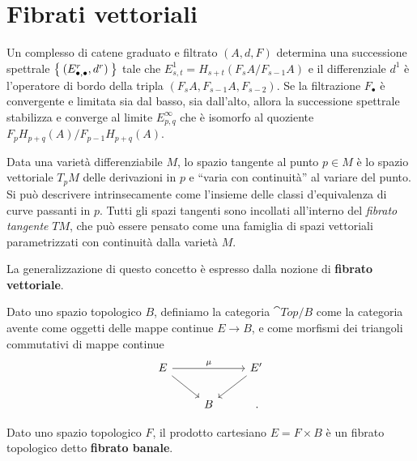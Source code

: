 
\chapter{Fibrati vettoriali}


\begin{thm}
	Un complesso di catene graduato e filtrato $(A,d,F)$ determina una successione spettrale
	$\Set{(E_{\bullet,\bullet}^{r},d^{r})}$ tale che
	$E_{s,t}^{1} = H_{s+t}(F_{s}A/F_{s-1}A)$ e il differenziale $d^{1}$ è
	l'operatore di bordo della tripla $(F_{s}A,F_{s-1}A,F_{s-2})$.
	Se la filtrazione $F_{\bullet}$ è convergente e limitata sia dal basso, sia dall'alto,
	allora la successione spettrale stabilizza e converge al limite $E^{\infty}_{p,q}$
	che è isomorfo al quoziente $F_{p}H_{p+q}(A)/F_{p-1}H_{p+q}(A)$.
\end{thm}



Data una varietà differenziabile $M$, lo spazio tangente al punto $p \in M$
è lo spazio vettoriale $T_{p}M$ delle derivazioni in $p$ e ``varia con continuità''
al variare del punto. Si può descrivere intrinsecamente
come l'insieme delle classi d'equivalenza di curve passanti in $p$.
Tutti gli spazi tangenti sono incollati all'interno
del \emph{fibrato tangente} $TM$, che può essere pensato come
una famiglia di spazi vettoriali 
parametrizzati con continuità dalla varietà $M$.

La generalizzazione di questo concetto è espresso dalla nozione
di \textbf{fibrato vettoriale}.

\begin{df}
	Dato uno spazio topologico $B$, definiamo la categoria $\cat{Top}/B$
	come la categoria avente come oggetti delle mappe continue $E \to B$,
	e come morfismi dei triangoli commutativi di mappe continue
	\begin{equation*}
		\begin{tikzcd}
			E \ar[rr, "\mu"] \ar[dr] & & E' \ar[dl] \\
			& B & \,.
		\end{tikzcd}
	\end{equation*}
\end{df}

\begin{ex}
	Dato uno spazio topologico $F$, il prodotto cartesiano $E = F \times B$
	è un fibrato topologico detto \textbf{fibrato banale}.
\end{ex}

